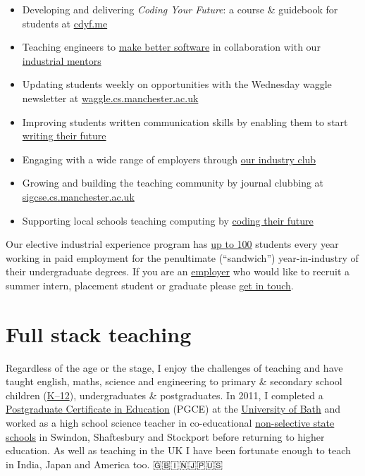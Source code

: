 \documentclass[
  12pt,
]{book}
\providecommand{\tightlist}{%
  \setlength{\itemsep}{0pt}\setlength{\parskip}{0pt}}
\begin{document}
\begin{itemize}
\tightlist
\item
  Developing and delivering \emph{Coding Your Future}: a course \& guidebook for students at \href{https://www.cdyf.me}{cdyf.me}
\item
  Teaching engineers to \href{https://software-eng.netlify.app/}{make better software} in collaboration with our \href{https://www.cs.manchester.ac.uk/connect/business-engagement/industrial-mentoring/}{industrial mentors}
\item
  Updating students weekly on opportunities with the Wednesday waggle newsletter at \href{https://waggle.cs.manchester.ac.uk/waggle/about}{waggle.cs.manchester.ac.uk}
\item
  Improving students written communication skills by enabling them to start \href{https://www.cdyf.me/writing.html}{writing their future}
\item
  Engaging with a wide range of employers through \href{https://www.cs.manchester.ac.uk/connect/business-engagement/}{our industry club}
\item
  Growing and building the teaching community by journal clubbing at \href{https://sigcse.cs.manchester.ac.uk/}{sigcse.cs.manchester.ac.uk}
\item
  Supporting local schools teaching computing by \href{https://personalpages.manchester.ac.uk/staff/duncan.hull/coding-their-future.html}{coding their future}
\end{itemize}

Our elective industrial experience program has \protect\hyperlink{employability}{up to 100} students every year working in paid employment for the penultimate (``sandwich'') year-in-industry of their undergraduate degrees. If you are an \href{https://personalpages.manchester.ac.uk/staff/duncan.hull/employers.html}{employer} who would like to recruit a summer intern, placement student or graduate please \href{https://personalpages.manchester.ac.uk/staff/duncan.hull/contact.html}{get in touch}. 🐝

\hypertarget{full-stack-teaching}{%
\section*{Full stack teaching}\label{full-stack-teaching}}

Regardless of the age or the stage, I enjoy the challenges of teaching and have taught english, maths, science and engineering to primary \& secondary school children (\href{https://en.wikipedia.org/wiki/K\%E2\%80\%9312}{K--12}), undergraduates \& postgraduates. In 2011, I completed a \href{https://en.wikipedia.org/wiki/Postgraduate_Certificate_in_Education}{Postgraduate Certificate in Education} (PGCE) at the \href{https://www.bath.ac.uk/}{University of Bath} and worked as a high school science teacher in co-educational \href{https://www.gov.uk/types-of-school}{non-selective state schools} in Swindon, Shaftesbury and Stockport before returning to higher education. As well as teaching in the UK I have been fortunate enough to teach in India, Japan and America too. 🇬🇧🇮🇳🇯🇵🇺🇸
\end{document}
